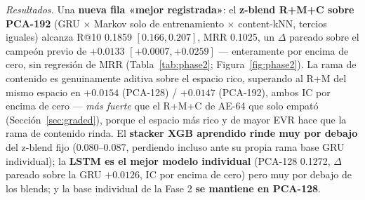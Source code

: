 \documentclass[11pt]{article}
\begin{document}
\emph{Resultados.} Una \textbf{nueva fila «mejor registrada»}: el \textbf{z-blend
R+M+C sobre PCA-192} (GRU $\times$ Markov solo de entrenamiento $\times$
content-kNN, tercios iguales) alcanza R@10 \num{0.1859} $[0.166, 0.207]$, MRR
\num{0.1025}, un $\Delta$ pareado sobre el campeón previo de $+\num{0.0133}$
$[+0.0007, +0.0259]$ --- enteramente por encima de cero, sin regresión de MRR
(Tabla~\ref{tab:phase2}; Figura~\ref{fig:phase2}). La rama de contenido es
genuinamente aditiva sobre el espacio rico, superando al R+M del mismo espacio en
$+\num{0.0154}$ (PCA-128) / $+\num{0.0147}$ (PCA-192), ambos IC por encima de
cero --- \emph{más fuerte} que el R+M+C de AE-64 que solo empató
(Sección~\ref{sec:graded}), porque el espacio más rico y de mayor EVR hace que la
rama de contenido rinda. El \textbf{stacker XGB aprendido rinde muy por debajo}
del z-blend fijo (\num{0.080}--\num{0.087}, perdiendo incluso ante su propia rama
base GRU individual); la \textbf{LSTM es el mejor modelo individual} (PCA-128
\num{0.1272}, $\Delta$ pareado sobre la GRU $+\num{0.0126}$, IC por encima de
cero) pero muy por debajo de los blends; y la base individual de la Fase 2
\textbf{se mantiene en PCA-128}.
\end{document}
